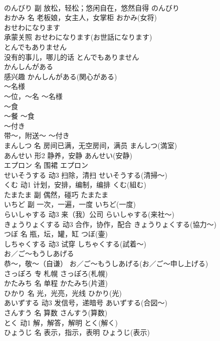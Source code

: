 \documentclass[8pt]{extreport}
\begin{document}
\begin{CJK}{UTF8}{min}
\\	のんびり	副	放松，轻松；悠闲自在，悠然自得	のんびり	
\\	おかみ	名	老板娘，女主人，女掌柜	おかみ(女将)	
\\	おせわになります	
\\	承蒙关照	おせわになります(お世話になります)	
\\	とんでもありません	
\\	没有的事儿，哪儿的话	とんでもありません	
\\	かんしんがある	
\\	感兴趣	かんしんがある(関心がある)	
\\	～名様	
\\	～位，～名	～名様	
\\	～食	
\\	～餐	～食	
\\	～付き	
\\	带～，附送～	～付き	
\\	まんしつ	名	房间已满，无空房间，满员	まんしつ(満室)	
\\	あんせい	形2	静养，安静	あんせい(安静)	
\\	エプロン	名	围裙	エプロン	
\\	せいそうする	动3	扫除，清扫	せいそうする(清掃～)	
\\	くむ	动1	计划，安排，编制，编排	くむ(組む)	
\\	たまたま	副	偶然，碰巧	たまたま	
\\	いちど	副	一次，一遍，一度	いちど(一度)	
\\	らいしゃする	动3	来（我）公司	らいしゃする(来社～)	
\\	きょうりょくする	动3	合作，协作，配合	きょうりょくする(協力～)	
\\	つぼ	名	瓶，坛，罐，缸	つぼ(壷)	
\\	しちゃくする	动3	试穿	しちゃくする(試着～)	
\\	お／ご～もうしあげる	
\\	恭～，敬～（自谦）	お／ご～もうしあげる(お／ご～申し上げる)	
\\	さっぽろ	专	札幌	さっぽろ(札幌)	
\\	かたみち	名	单程	かたみち(片道)	
\\	ひかり	名	光，光亮，光线	ひかり(光)	
\\	あいずする	动3	发信号，递暗号	あいずする(合図～)	
\\	さんすう	名	算数	さんすう(算数)	
\\	とく	动1	解，解答，解明	とく(解く)	
\\	ひょうじ	名	表示，指示，表明	ひょうじ(表示)	

\end{CJK}
\end{document}
